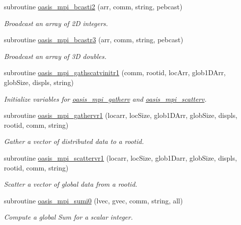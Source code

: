 \begin{DoxyCompactItemize}
subroutine \hyperlink{namespacemod__oasis__mpi_ad6918adccdd62a278066f41b0b8edf57}{oasis\+\_\+mpi\+\_\+bcasti2} (arr, comm, string, pebcast)
\begin{DoxyCompactList}\small\item\em Broadcast an array of 2D integers. \end{DoxyCompactList}\item 
subroutine \hyperlink{namespacemod__oasis__mpi_ac01edbda3e33b1feff9b797f83f82e8c}{oasis\+\_\+mpi\+\_\+bcastr3} (arr, comm, string, pebcast)
\begin{DoxyCompactList}\small\item\em Broadcast an array of 3D doubles. \end{DoxyCompactList}\item 
subroutine \hyperlink{namespacemod__oasis__mpi_a68afb4ab4136545faeaa2c37a1eb294a}{oasis\+\_\+mpi\+\_\+gathscatvinitr1} (comm, rootid, loc\+Arr, glob1\+D\+Arr, glob\+Size, displs, string)
\begin{DoxyCompactList}\small\item\em Initialize variables for \hyperlink{interfacemod__oasis__mpi_1_1oasis__mpi__gatherv}{oasis\+\_\+mpi\+\_\+gatherv} and \hyperlink{interfacemod__oasis__mpi_1_1oasis__mpi__scatterv}{oasis\+\_\+mpi\+\_\+scatterv}. \end{DoxyCompactList}\item 
subroutine \hyperlink{namespacemod__oasis__mpi_a88a13ea3b4f96074669fdc872fe41728}{oasis\+\_\+mpi\+\_\+gathervr1} (locarr, loc\+Size, glob1\+D\+Arr, glob\+Size, displs, rootid, comm, string)
\begin{DoxyCompactList}\small\item\em Gather a vector of distributed data to a rootid. \end{DoxyCompactList}\item 
subroutine \hyperlink{namespacemod__oasis__mpi_a9d0d807b92d39c9789eea4744d331612}{oasis\+\_\+mpi\+\_\+scattervr1} (locarr, loc\+Size, glob1\+Darr, glob\+Size, displs, rootid, comm, string)
\begin{DoxyCompactList}\small\item\em Scatter a vector of global data from a rootid. \end{DoxyCompactList}\item 
subroutine \hyperlink{namespacemod__oasis__mpi_adbb3963310e45ac012e5e28f13d5781e}{oasis\+\_\+mpi\+\_\+sumi0} (lvec, gvec, comm, string, all)
\begin{DoxyCompactList}\small\item\em Compute a global Sum for a scalar integer. \end{DoxyCompactList}\item 

\end{DoxyCompactItemize}
